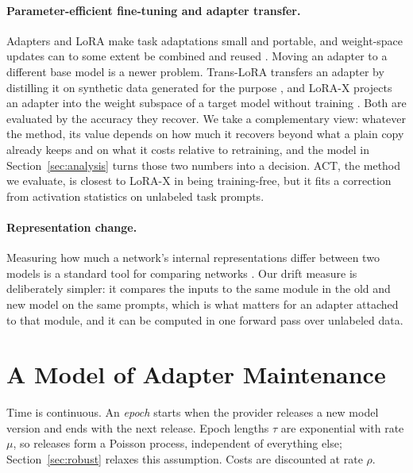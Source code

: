 \documentclass[ijds,nonblindrev]{informs4}
\begin{document}
\paragraph{Parameter-efficient fine-tuning and adapter transfer.} Adapters \citep{houlsby2019parameter} and LoRA \citep{hu2022lora} make task adaptations small and portable, and weight-space updates can to some extent be combined and reused \citep{ilharco2023editing}. Moving an adapter to a different base model is a newer problem. Trans-LoRA transfers an adapter by distilling it on synthetic data generated for the purpose \citep{wang2024translora}, and LoRA-X projects an adapter into the weight subspace of a target model without training \citep{farhadzadeh2025lorax}. Both are evaluated by the accuracy they recover. We take a complementary view: whatever the method, its value depends on how much it recovers beyond what a plain copy already keeps and on what it costs relative to retraining, and the model in Section~\ref{sec:analysis} turns those two numbers into a decision. ACT, the method we evaluate, is closest to LoRA-X in being training-free, but it fits a correction from activation statistics on unlabeled task prompts.

\paragraph{Representation change.} Measuring how much a network's internal representations differ between two models is a standard tool for comparing networks \citep{kornblith2019similarity}. Our drift measure is deliberately simpler: it compares the inputs to the same module in the old and new model on the same prompts, which is what matters for an adapter attached to that module, and it can be computed in one forward pass over unlabeled data.

\section{A Model of Adapter Maintenance}\label{sec:model}

Time is continuous. An \emph{epoch} starts when the provider releases a new model version and ends with the next release. Epoch lengths $\tau$ are exponential with rate $\mu$, so releases form a Poisson process, independent of everything else; Section~\ref{sec:robust} relaxes this assumption. Costs are discounted at rate $\rho$.
\end{document}
